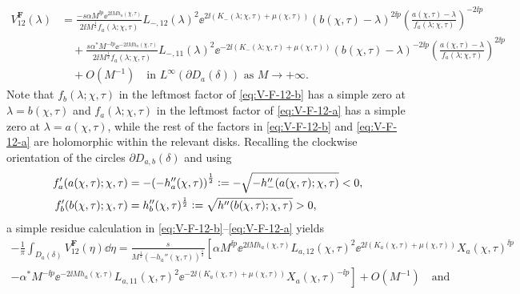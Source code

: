 \begin{equation}
\begin{split}
V^{\mathbf{F}}_{12}(\lambda) &=
\frac{-s \alpha M^{\ii p} \ee^{2\ii M {h}_a(\chi,\tau)} }{2\ii M^{\frac{1}{2}} f_a(\lambda;\chi,\tau)} L_{-,12}(\lambda)^2 \ee^{2\ii (K_-(\lambda;\chi,\tau) +\mu(\chi,\tau) )} (b(\chi,\tau)-\lambda)^{2\ii p} 
\left( \frac{a(\chi,\tau)-\lambda}{f_a(\lambda;\chi,\tau)} \right)^{-2\ii p}\\
&\quad + 
\frac{s \alpha^* M^{-\ii p} \ee^{-2\ii M {h}_a(\chi,\tau)} }{2\ii M^{\frac{1}{2}} f_a(\lambda;\chi,\tau)} L_{-,11}(\lambda)^2 \ee^{-2\ii (K_-(\lambda;\chi,\tau)+\mu(\chi,\tau) )}  (b(\chi,\tau)-\lambda)^{-2\ii p} 
\left( \frac{a(\chi,\tau)-\lambda}{f_a(\lambda;\chi,\tau)} \right)^{2\ii p}\\
&\quad+ O(M^{-1})\quad \text{in $L^\infty(\partial D_a(\delta))$ as $M\to+\infty$}.
\end{split}
\label{eq:V-F-12-a}
\end{equation}
Note that $f_b(\lambda;\chi,\tau)$ in the leftmost factor of \eqref{eq:V-F-12-b} has a simple zero at $\lambda=b(\chi,\tau)$ and $f_a(\lambda;\chi,\tau)$ in the leftmost factor of \eqref{eq:V-F-12-a} has a simple zero at $\lambda=a(\chi,\tau)$, while the rest of the factors in \eqref{eq:V-F-12-b} and \eqref{eq:V-F-12-a} are holomorphic within the relevant disks.
Recalling the clockwise orientation of the circles $\partial D_{a,b}(\delta)$ and using 
\begin{align}
f_a'(a(\chi,\tau);\chi,\tau)& = - \left(-h_a''(\chi,\tau)\right)^{\frac{1}{2}}  \defeq  -\sqrt{-h''_-(a(\chi,\tau);\chi,\tau)}<0,\\
f_b'(b(\chi,\tau);\chi,\tau)& = h_b''(\chi,\tau)^{\frac{1}{2}}  \defeq  \sqrt{h''(b(\chi,\tau);\chi,\tau)}>0,
\end{align}
a simple residue calculation in \eqref{eq:V-F-12-b}--\eqref{eq:V-F-12-a} yields
\begin{multline}
-\frac{1}{\pi} \int_{D_{a}(\delta)} V^{\mathbf{F}}_{12}(\eta)\dd \eta = \frac{s}{M^{\frac{1}{2}} \left(-h_a''(\chi,\tau)\right)^{\frac{1}{2}}}
\left[ 
\alpha M^{\ii p} \ee^{2\ii M {h}_a(\chi,\tau)} L_{a,12}(\chi,\tau)^2 \ee^{2\ii (K_a(\chi,\tau) + \mu(\chi,\tau) )} X_a(\chi,\tau)^{\ii p}
\right.\\
\left. -\alpha^* M^{-\ii p} \ee^{-2\ii M {h}_a(\chi,\tau)}  
L_{a,11}(\chi,\tau)^2 \ee^{-2 \ii (K_a(\chi,\tau) + \mu(\chi,\tau) )}  X_a(\chi,\tau)^{-\ii p}
\right] + O(M^{-1})\quad\text{and}
\label{eq:V-F-12-a-residue}
\end{multline}
